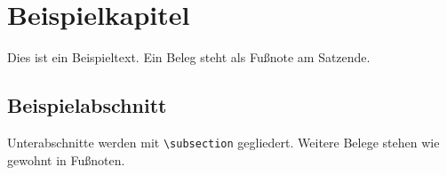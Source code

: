 \section{Beispielkapitel}

Dies ist ein Beispieltext. Ein Beleg steht als Fußnote am Satzende.\autocite[12]{mustermann2024}

\subsection{Beispielabschnitt}

Unterabschnitte werden mit \verb|\subsection| gegliedert. Weitere Belege
stehen wie gewohnt in Fußnoten.\autocite{mustermann2024}
